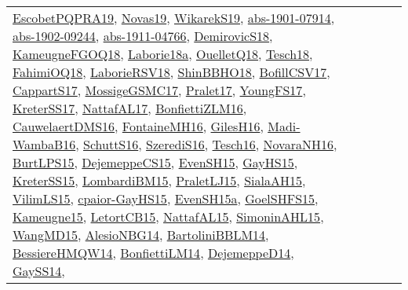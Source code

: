 {\begin{longtable}{llp{6cm}p{6cm}p{6cm}}
\href{articles/EscobetPQPRA19.pdf}{EscobetPQPRA19}\cite{EscobetPQPRA19}, \href{articles/Novas19.pdf}{Novas19}\cite{Novas19}, \href{articles/WikarekS19.pdf}{WikarekS19}\cite{WikarekS19}, \href{articles/abs-1901-07914.pdf}{abs-1901-07914}\cite{abs-1901-07914}, \href{articles/abs-1902-09244.pdf}{abs-1902-09244}\cite{abs-1902-09244}, \href{articles/abs-1911-04766.pdf}{abs-1911-04766}\cite{abs-1911-04766}, \href{papers/DemirovicS18.pdf}{DemirovicS18}\cite{DemirovicS18}, \href{papers/KameugneFGOQ18.pdf}{KameugneFGOQ18}\cite{KameugneFGOQ18}, \href{papers/Laborie18a.pdf}{Laborie18a}\cite{Laborie18a}, \href{papers/OuelletQ18.pdf}{OuelletQ18}\cite{OuelletQ18}, \href{papers/Tesch18.pdf}{Tesch18}\cite{Tesch18}, \href{articles/FahimiOQ18.pdf}{FahimiOQ18}\cite{FahimiOQ18}, \href{articles/LaborieRSV18.pdf}{LaborieRSV18}\cite{LaborieRSV18}, \href{articles/ShinBBHO18.pdf}{ShinBBHO18}\cite{ShinBBHO18}, \href{papers/BofillCSV17.pdf}{BofillCSV17}\cite{BofillCSV17}, \href{papers/CappartS17.pdf}{CappartS17}\cite{CappartS17}, \href{papers/MossigeGSMC17.pdf}{MossigeGSMC17}\cite{MossigeGSMC17}, \href{papers/Pralet17.pdf}{Pralet17}\cite{Pralet17}, \href{papers/YoungFS17.pdf}{YoungFS17}\cite{YoungFS17}, \href{articles/KreterSS17.pdf}{KreterSS17}\cite{KreterSS17}, \href{articles/NattafAL17.pdf}{NattafAL17}\cite{NattafAL17}, \href{papers/BonfiettiZLM16.pdf}{BonfiettiZLM16}\cite{BonfiettiZLM16}, \href{papers/CauwelaertDMS16.pdf}{CauwelaertDMS16}\cite{CauwelaertDMS16}, \href{papers/FontaineMH16.pdf}{FontaineMH16}\cite{FontaineMH16}, \href{papers/GilesH16.pdf}{GilesH16}\cite{GilesH16}, \href{papers/Madi-WambaB16.pdf}{Madi-WambaB16}\cite{Madi-WambaB16}, \href{papers/SchuttS16.pdf}{SchuttS16}\cite{SchuttS16}, \href{papers/SzerediS16.pdf}{SzerediS16}\cite{SzerediS16}, \href{papers/Tesch16.pdf}{Tesch16}\cite{Tesch16}, \href{articles/NovaraNH16.pdf}{NovaraNH16}\cite{NovaraNH16}, \href{papers/BurtLPS15.pdf}{BurtLPS15}\cite{BurtLPS15}, \href{papers/DejemeppeCS15.pdf}{DejemeppeCS15}\cite{DejemeppeCS15}, \href{papers/EvenSH15.pdf}{EvenSH15}\cite{EvenSH15}, \href{papers/GayHS15.pdf}{GayHS15}\cite{GayHS15}, \href{papers/KreterSS15.pdf}{KreterSS15}\cite{KreterSS15}, \href{papers/LombardiBM15.pdf}{LombardiBM15}\cite{LombardiBM15}, \href{papers/PraletLJ15.pdf}{PraletLJ15}\cite{PraletLJ15}, \href{papers/SialaAH15.pdf}{SialaAH15}\cite{SialaAH15}, \href{papers/VilimLS15.pdf}{VilimLS15}\cite{VilimLS15}, \href{papers/cpaior-GayHS15.pdf}{cpaior-GayHS15}\cite{cpaior-GayHS15}, \href{articles/EvenSH15a.pdf}{EvenSH15a}\cite{EvenSH15a}, \href{articles/GoelSHFS15.pdf}{GoelSHFS15}\cite{GoelSHFS15}, \href{articles/Kameugne15.pdf}{Kameugne15}\cite{Kameugne15}, \href{articles/LetortCB15.pdf}{LetortCB15}\cite{LetortCB15}, \href{articles/NattafAL15.pdf}{NattafAL15}\cite{NattafAL15}, \href{articles/SimoninAHL15.pdf}{SimoninAHL15}\cite{SimoninAHL15}, \href{articles/WangMD15.pdf}{WangMD15}\cite{WangMD15}, \href{papers/AlesioNBG14.pdf}{AlesioNBG14}\cite{AlesioNBG14}, \href{papers/BartoliniBBLM14.pdf}{BartoliniBBLM14}\cite{BartoliniBBLM14}, \href{papers/BessiereHMQW14.pdf}{BessiereHMQW14}\cite{BessiereHMQW14}, \href{papers/BonfiettiLM14.pdf}{BonfiettiLM14}\cite{BonfiettiLM14}, \href{papers/DejemeppeD14.pdf}{DejemeppeD14}\cite{DejemeppeD14}, \href{papers/GaySS14.pdf}{GaySS14}\cite{GaySS14}, 
\end{longtable}}
